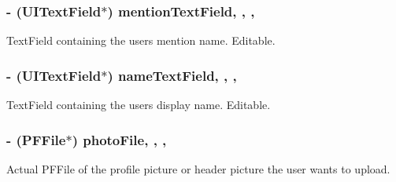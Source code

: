 \subsubsection[{mention\+Text\+Field}]{\setlength{\rightskip}{0pt plus 5cm}-\/ (U\+I\+Text\+Field$\ast$) mention\+Text\+Field\hspace{0.3cm}{\ttfamily [read]}, {\ttfamily [write]}, {\ttfamily [nonatomic]}, {\ttfamily [strong]}}\label{interface_e_s_edit_profile_view_controller_a7e40d43c7b337b92e03309abc2752d9b}
Text\+Field containing the user\textquotesingle{}s mention name. Editable. \hypertarget{interface_e_s_edit_profile_view_controller_aadadfd57e7077ce66e81b70d2224b101}{}
\subsubsection[{name\+Text\+Field}]{\setlength{\rightskip}{0pt plus 5cm}-\/ (U\+I\+Text\+Field$\ast$) name\+Text\+Field\hspace{0.3cm}{\ttfamily [read]}, {\ttfamily [write]}, {\ttfamily [nonatomic]}, {\ttfamily [strong]}}\label{interface_e_s_edit_profile_view_controller_aadadfd57e7077ce66e81b70d2224b101}
Text\+Field containing the user\textquotesingle{}s display name. Editable. \hypertarget{interface_e_s_edit_profile_view_controller_a6811ffd29191e263efa7a601fdcf7530}{}
\subsubsection[{photo\+File}]{\setlength{\rightskip}{0pt plus 5cm}-\/ (P\+F\+File$\ast$) photo\+File\hspace{0.3cm}{\ttfamily [read]}, {\ttfamily [write]}, {\ttfamily [nonatomic]}, {\ttfamily [strong]}}\label{interface_e_s_edit_profile_view_controller_a6811ffd29191e263efa7a601fdcf7530}
Actual P\+F\+File of the profile picture or header picture the user wants to upload. \hypertarget{interface_e_s_edit_profile_view_controller_a6a86d1bff921b0bf6629907cada17808}{}
